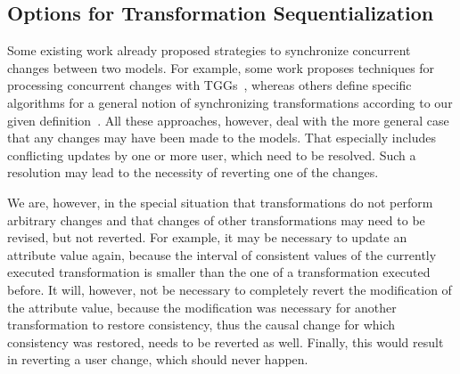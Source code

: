 


\subsection{Options for Transformation Sequentialization}

Some existing work already proposed strategies to synchronize concurrent changes between two models.
For example, some work proposes techniques for processing concurrent changes with \glspl{TGG}~\cite{hermann2012concurrentSynchronization-FASE,orejas2020IncrementalConcurrentSynchronization-FASE}, whereas others define specific algorithms for a general notion of synchronizing transformations according to our given definition~\cite{xiong2013SynchronizingConcurrentUpdates-SoSym,xiong2009parallelUpdates-ICMT}.
All these approaches, however, deal with the more general case that any changes may have been made to the models.
That especially includes conflicting updates by one or more user, which need to be resolved.
Such a resolution may lead to the necessity of reverting one of the changes.

We are, however, in the special situation that transformations do not perform arbitrary changes and that changes of other transformations may need to be revised, but not reverted.
For example, it may be necessary to update an attribute value again, because the interval of consistent values of the currently executed transformation is smaller than the one of a transformation executed before.
It will, however, not be necessary to completely revert the modification of the attribute value, because the modification was necessary for another transformation to restore consistency, thus the causal change for which consistency was restored, needs to be reverted as well.
Finally, this would result in reverting a user change, which should never happen.

